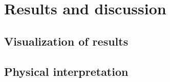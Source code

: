 \section{Results and discussion}

\subsection{Visualization of results}

\subsection{Physical interpretation}